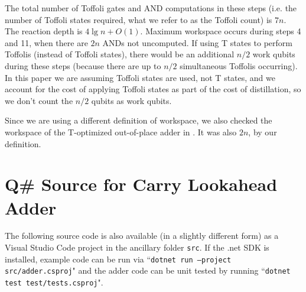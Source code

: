 \documentclass[onecolumn,unpublished]{quantumarticle}
\theoremstyle{definition}
\theoremstyle{definition}
\theoremstyle{definition}
\begin{document}
The total number of Toffoli gates and AND computations in these steps (i.e. the number of Toffoli states required, what we refer to as the Toffoli count) is $7n$.
The reaction depth is $4 \lg n + O(1)$.
Maximum workspace occurs during steps 4 and 11, when there are $2n$ ANDs not uncomputed.
If using T states to perform Toffolis (instead of Toffoli states), there would be an additional $n/2$ work qubits during these steps (because there are up to $n/2$ simultaneous Toffolis occurring).
In this paper we are assuming Toffoli states are used, not T states, and we account for the cost of applying Toffoli states as part of the cost of distillation, so we don't count the $n/2$ qubits as work qubits.

Since we are using a different definition of workspace, we also checked the workspace of the T-optimized out-of-place adder in \cite{thapliyal2020lookahead}.
It was also $2n$, by our definition.

\section{Q\# Source for Carry Lookahead Adder}
\label{app:carryadder}

The following source code is also available (in a slightly different form) as a Visual Studio Code project in the ancillary folder \texttt{src}.
If the .net SDK is installed, example code can be run via ``\texttt{dotnet run --project src/adder.csproj}" and the adder code can be unit tested by running ``\texttt{dotnet test test/tests.csproj}".
\end{document}
